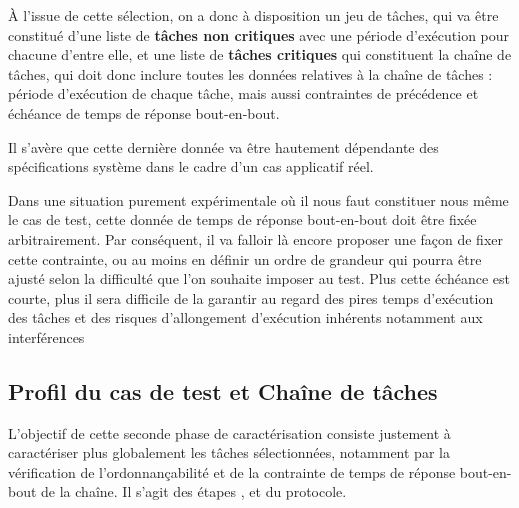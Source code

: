 \documentclass[french, a4paper, 11pt, twoside, pdftex]{StyleThese}
\begin{document}
    		À l'issue de cette sélection, on a donc à disposition un jeu de tâches, qui va être constitué d'une liste de \textbf{tâches non critiques} avec une période d'exécution pour chacune d'entre elle, et une liste de \textbf{tâches critiques} qui constituent la chaîne de tâches, qui doit donc inclure toutes les données relatives à la chaîne de tâches : période d'exécution de chaque tâche, mais aussi contraintes de précédence et échéance de temps de réponse bout-en-bout.
    		
    		Il s'avère que cette dernière donnée va être hautement dépendante des spécifications système dans le cadre d'un cas applicatif réel. 
    		
    		Dans une situation purement expérimentale où il nous faut constituer nous même le cas de test, cette donnée de temps de réponse bout-en-bout doit être fixée arbitrairement. Par conséquent, il va falloir là encore proposer une façon de fixer cette contrainte, ou au moins en définir un ordre de grandeur qui pourra être ajusté selon la difficulté que l'on souhaite imposer au test. Plus cette échéance est courte, plus il sera difficile de la garantir au regard des pires temps d'exécution des tâches et des risques d'allongement d'exécution inhérents notamment aux interférences
    		
                    
    \subsection{Profil du cas de test et Chaîne de tâches}
    
L'objectif de cette seconde phase de caractérisation consiste justement à caractériser plus globalement les tâches sélectionnées, notamment par la vérification de l'ordonnançabilité et de la contrainte de temps de réponse bout-en-bout de la chaîne. Il s'agit des étapes ,  et  du protocole.
\end{document}
